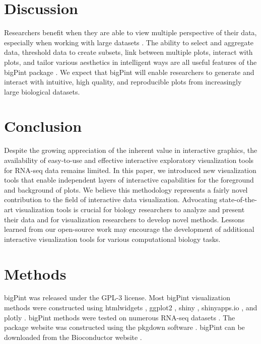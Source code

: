 \documentclass[parskip=full]{bmcart} %
\begin{document}
\section*{Discussion}

Researchers benefit when they are able to view multiple perspective of their data, especially when working with large datasets \cite{swayne2003ggobi, cook2007interactive}. The ability to select and aggregate data, threshold data to create subsets, link between multiple plots, interact with plots, and tailor various aesthetics in intelligent ways are all useful features of the bigPint package \cite{o2010visualizing, pavlopoulos2015visualizing, kerren2007human}. We expect that bigPint will enable researchers to generate and interact with intuitive, high quality, and reproducible plots from increasingly large biological datasets. 

\section*{Conclusion}

Despite the growing appreciation of the inherent value in interactive graphics, the availability of easy-to-use and effective interactive exploratory visualization tools for RNA-seq data remains limited. In this paper, we introduced new visualization tools that enable independent layers of interactive capabilities for the foreground and background of plots. We believe this methodology represents a fairly novel contribution to the field of interactive data visualization. Advocating state-of-the-art visualization tools is crucial for biology researchers to analyze and present their data and for visualization researchers to develop novel methods. Lessons learned from our open-source work may encourage the development of additional interactive visualization tools for various computational biology tasks.

\section*{Methods}

bigPint was released under the GPL-3 license. Most bigPint visualization methods were constructed using htmlwidgets \cite{htmlwidgets}, ggplot2 \cite{ggplot2}, shiny \cite{shiny}, shinyapps.io \cite{rstudio}, and plotly \cite{plotly}. bigPint methods were tested on numerous RNA-seq datasets \cite{rutter1, rutter2}. The package website was constructed using the pkgdown software \cite{pkgdown}. bigPint can be downloaded from the Bioconductor website \cite{gentleman2004bioconductor}. 
\end{document}
